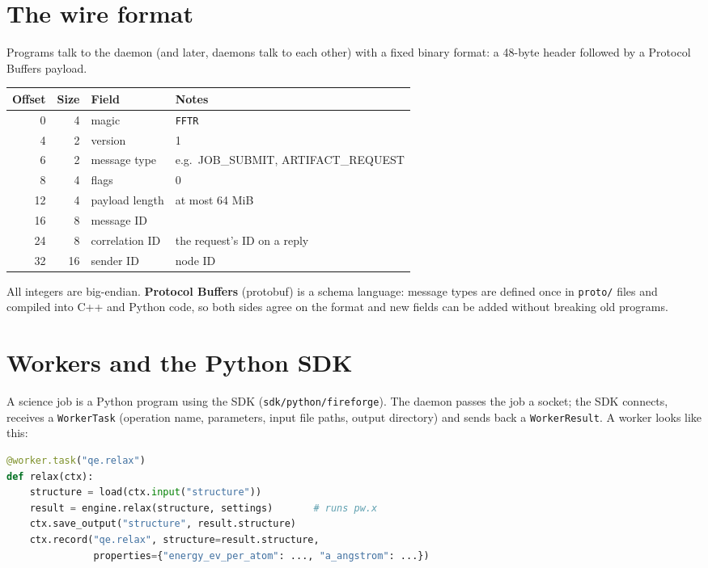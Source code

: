 \documentclass[11pt,a4paper]{report}
\newcommand{\code}[1]{\texttt{#1}}
\begin{document}
\section{The wire format}

Programs talk to the daemon (and later, daemons talk to each other) with a fixed binary
format: a 48-byte header followed by a Protocol Buffers payload.

\begin{center}
\small
\begin{tabular}{rrll}
\toprule
Offset & Size & Field & Notes\\
\midrule
0 & 4 & magic & \code{FFTR}\\
4 & 2 & version & 1\\
6 & 2 & message type & e.g.\ JOB\_SUBMIT, ARTIFACT\_REQUEST\\
8 & 4 & flags & 0\\
12 & 4 & payload length & at most 64 MiB\\
16 & 8 & message ID & \\
24 & 8 & correlation ID & the request's ID on a reply\\
32 & 16 & sender ID & node ID\\
\bottomrule
\end{tabular}
\end{center}

All integers are big-endian. \textbf{Protocol Buffers} (protobuf) is a schema language: message
types are defined once in \code{proto/} files and compiled into C++ and Python code, so both
sides agree on the format and new fields can be added without breaking old programs.

\section{Workers and the Python SDK}

A science job is a Python program using the SDK (\code{sdk/python/fireforge}). The daemon
passes the job a socket; the SDK connects, receives a \code{WorkerTask} (operation name,
parameters, input file paths, output directory) and sends back a \code{WorkerResult}. A worker
looks like this:

\begin{lstlisting}[language=Python]
@worker.task("qe.relax")
def relax(ctx):
    structure = load(ctx.input("structure"))
    result = engine.relax(structure, settings)       # runs pw.x
    ctx.save_output("structure", result.structure)
    ctx.record("qe.relax", structure=result.structure,
               properties={"energy_ev_per_atom": ..., "a_angstrom": ...})
\end{lstlisting}
\end{document}
